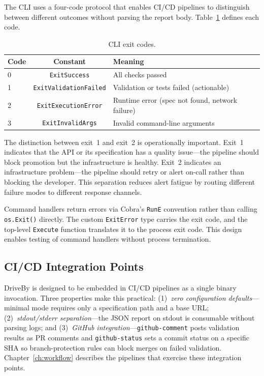 The CLI uses a four-code protocol that enables CI/CD pipelines to distinguish between different outcomes without parsing the report body. Table~\ref{tab:exit-codes} defines each code.

\begin{table}[htbp]
\centering
\caption{CLI exit codes.}
\label{tab:exit-codes}
\small
\begin{tabular}{@{}lcp{}@{}}
\toprule
\textbf{Code} & \textbf{Constant} & \textbf{Meaning} \\
\midrule
0 & \texttt{ExitSuccess}          & All checks passed \\
1 & \texttt{ExitValidationFailed} & Validation or tests failed (actionable) \\
2 & \texttt{ExitExecutionError}   & Runtime error (spec not found, network failure) \\
3 & \texttt{ExitInvalidArgs}      & Invalid command-line arguments \\
\bottomrule
\end{tabular}
\end{table}

The distinction between exit~1 and exit~2 is operationally important. Exit~1 indicates that the API or its specification has a quality issue---the pipeline should block promotion but the infrastructure is healthy. Exit~2 indicates an infrastructure problem---the pipeline should retry or alert on-call rather than blocking the developer. This separation reduces alert fatigue by routing different failure modes to different response channels.

Command handlers return errors via Cobra's \texttt{RunE} convention rather than calling \texttt{os.Exit()} directly. The custom \texttt{ExitError} type carries the exit code, and the top-level \texttt{Execute} function translates it to the process exit code. This design enables testing of command handlers without process termination.

\subsection{CI/CD Integration Points}
\label{subsec:cicd-integration}

DriveBy is designed to be embedded in CI/CD pipelines as a single binary invocation. Three properties make this practical: (1)~\textit{zero configuration defaults}---minimal mode requires only a specification path and a base URL; (2)~\textit{stdout/stderr separation}---the JSON report on stdout is consumable without parsing logs; and (3)~\textit{GitHub integration}---\texttt{github-comment} posts validation results as PR comments and \texttt{github-status} sets a commit status on a specific SHA so branch-protection rules can block merges on failed validation. Chapter~\ref{ch:workflow} describes the pipelines that exercise these integration points.

